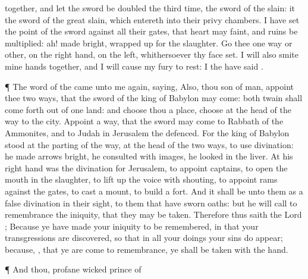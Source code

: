 {together, and let the
sword be
doubled the
third time, the
sword of the
slain: it
{} the
sword of the
great
{}
slain, which entereth into their privy
chambers.
I have
set the
point of the
sword against all their
gates, that
{}
heart may
faint, and
{}
ruins be
multiplied:
ah!
{}
made
bright,
{} wrapped
up for the
slaughter.
Go thee one way or
other,
{}
on the right
hand,
{} on the
left,
whithersoever thy
face
{}
set.
I will also
smite mine
hands
together, and I will cause my
fury to
rest: I the
{} have
said
{}.
\par }{\PP {}¶ The
word of the
{} came unto me again,
saying,
Also, thou
son of
man,
appoint thee
two
ways, that the
sword of the
king of
Babylon may
come: both
twain shall come
forth out of
one
land: and
choose thou a
place,
choose
{} at the
head of the
way to the
city.
Appoint a
way, that the
sword may
come to
Rabbath of the
Ammonites, and to
Judah in
Jerusalem the
defenced.
For the
king of
Babylon
stood at the
parting of the
way, at the
head of the
two
ways, to
use
divination: he made
{}
arrows
bright, he
consulted with
images, he
looked in the
liver.
At his right
hand was the
divination for
Jerusalem, to
appoint
captains, to
open the
mouth in the
slaughter, to lift
up the
voice with
shouting, to
appoint
{}
rams against the
gates, to
cast a
mount,
{} to
build a
fort.
And it shall be unto them as a
false
divination in their
sight, to them that have
sworn
oaths: but he will call to
remembrance the
iniquity, that they may be
taken.
Therefore thus
saith the
Lord
{}; Because ye have made your
iniquity to be
remembered, in that your
transgressions are
discovered, so that in all your
doings your
sins do
appear; because,
{}, that ye are come to
remembrance, ye shall be
taken with the
hand.
\par }{\PP {}¶ And thou,
profane
wicked
prince of
}
